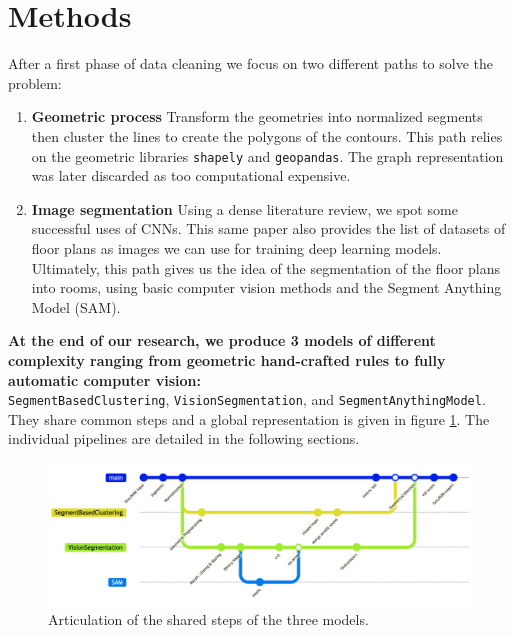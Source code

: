 \documentclass[11pt]{article}
\begin{document}
\section{Methods}
\label{sec:methods}

After a first phase of data cleaning we focus on two different paths to solve the problem:

\begin{enumerate}
    \item \textbf{Geometric process} Transform the geometries into normalized segments 
    \cite{Schafer2011AutomaticGO} then cluster the lines to 
    create the polygons\cite{dominguez2012Semiautomaticdetection} of the contours. This path relies on the
    geometric libraries \texttt{shapely} and \texttt{geopandas}. The graph representation 
    was later discarded as too computational expensive.
    \item \textbf{Image segmentation} Using a dense literature review\cite{PIZARRO2022104348}, we 
    spot some successful uses of CNNs\cite{ijgi10020097}. This same paper also provides the list
    of datasets of floor plans as images we can use for training deep learning models.
    Ultimately, this path gives us the idea of the segmentation of the floor plans 
    into rooms, using basic computer vision methods and the Segment 
    Anything Model (SAM)\cite{kirillov2023segment}.
\end{enumerate}

\textbf{At the end of our research, we produce 3 models of different complexity
ranging from geometric hand-crafted rules to fully automatic computer vision:}\\ 
\texttt{SegmentBasedClustering}, 
\texttt{VisionSegmentation}, 
and \texttt{SegmentAnythingModel}.\\ They share common steps and a global representation
is given in figure \ref{fig:global_pipeline}. The individual pipelines are detailed 
in the following sections.
\begin{figure}[h]
    \centering
    \includegraphics[width=01\linewidth]{figures/CapstoneGit.png}
    \caption{Articulation of the shared steps of the three models.}
    \label{fig:global_pipeline}
\end{figure}
\end{document}
